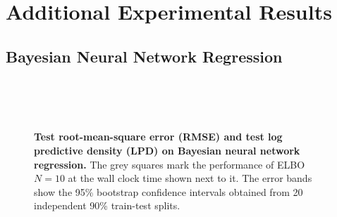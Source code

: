 
\section{Additional Experimental Results}
\subsection{Bayesian Neural Network Regression}\label{section:bnn_additional}

\begin{figure}[H]
  \centering
  \vspace{0.05in}\\
  \vspace{0.05in}\\
  \vspace{0.05in}\\
  \caption{\textbf{Test root-mean-square error (RMSE) and test log predictive density (LPD) on Bayesian neural network regression.} 
    The grey squares mark the performance of ELBO \(N=10\) at the wall clock time shown next to it.
  The error bands show the 95\% bootstrap confidence intervals obtained from 20 independent 90\% train-test splits.}
\end{figure}

